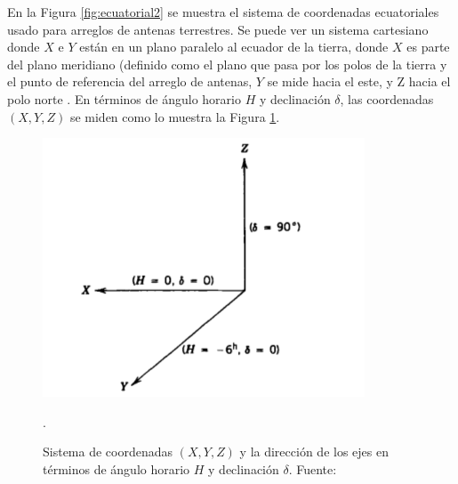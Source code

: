 En la Figura \ref{fig:ecuatorial2} se muestra el sistema de coordenadas ecuatoriales usado para arreglos de antenas terrestres. Se puede ver un sistema cartesiano donde $X$ e $Y$ están en un plano paralelo al ecuador de la tierra, donde $X$ es parte del plano meridiano (definido como el plano que pasa por los polos de la tierra y el punto de referencia del arreglo de antenas, $Y$ se mide hacia el este, y Z hacia el polo norte \citep{libroAstro}. En términos de ángulo horario $H$ y declinación $\delta$, las coordenadas $(X,Y,Z)$ se miden como lo muestra la Figura \ref{fig:ecuatorial1}.
\begin{figure}[h!]
	\centering
	\includegraphics[scale=0.6]{images/ecuatorial1.png}
	\caption{Sistema de coordenadas $(X,Y,Z)$ y la dirección de los ejes en términos de ángulo horario $H$ y declinación $\delta$. Fuente: \citep{libroAstro}}.
	\label{fig:ecuatorial1}
\end{figure}

